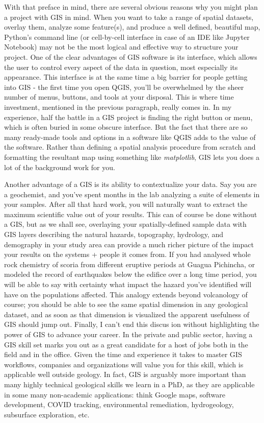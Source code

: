\documentclass{article}
\begin{document}
With that preface in mind, there are several obvious reasons why you might plan a project with GIS in mind. When you want to take a range of spatial datasets, overlay them, analyze some feature(s), and produce a well defined, beautiful map, Python's command line (or cell-by-cell interface in case of an IDE like Jupyter Notebook) may not be the most logical and effective way to structure your project. One of the clear advantages of GIS software is its interface, which allows the user to control every aspect of the data in question, most especially its appearance. This interface is at the same time a big barrier for people getting into GIS - the first time you open QGIS, you'll be overwhelmed by the sheer number of menus, buttons, and tools at your disposal. This is where time investment, mentioned in the previous paragraph, really comes in. In my experience, half the battle in a GIS project is finding the right button or menu, which is often buried in some obscure interface. But the fact that there are so many ready-made tools and options in a software like QGIS adds to the value of the software. Rather than defining a spatial analysis procedure from scratch and formatting the resultant map using something like \textit{matplotlib}, GIS lets you does a lot of the background work for you. 

Another advantage of a GIS is its ability to contextualize your data. Say you are a geochemist, and you've spent months in the lab analyzing a suite of elements in your samples. After all that hard work, you will naturally want to extract the maximum scientific value out of your results. This can of course be done without a GIS, but as we shall see, overlaying your spatially-defined sample data with GIS layers describing the natural hazards, topography, hydrology, and demography in your study area can provide a much richer picture of the impact your results on the systems + people it comes from. If you had analysed whole rock chemistry of scoria from different eruptive periods at Guagua Pichincha, or modeled the record of earthquakes below the edifice over a long time period, you will be able to say with certainty what impact the hazard you've identified will have on the populations affected. This analogy extends beyond volcanology of course; you should be able to see the same spatial dimension in any geological dataset, and as soon as that dimension is visualized the apparent usefulness of GIS should jump out. Finally, I can't end this discus ion without highlighting the power of GIS to advance your career. In the private and public sector, having a GIS skill set marks you out as a great candidate for a host of jobs both in the field and in the office. Given the time and experience it takes to master GIS workflows, companies and organizations will value you for this skill, which is applicable well outside geology. In fact, GIS is arguably more important than many highly technical geological skills we learn in a PhD, as they are applicable in some many non-academic applications: think Google maps, software development, COVID tracking, environmental remediation, hydrogeology, subsurface exploration, etc. 
\end{document}
